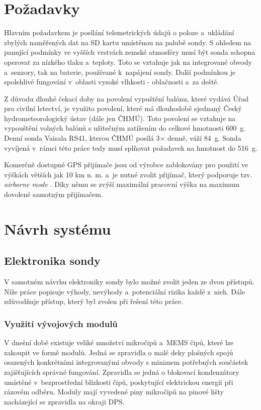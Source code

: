 \documentclass[twoside]{ctuthesis}
\theoremstyle{plain}
\theoremstyle{definition}
\theoremstyle{note}
\begin{document}
	\section{Požadavky}
	Hlavním požadavkem je posílání telemetrických údajů o poloze a~ukládání zbylých naměřených dat na SD kartu umístěnou na palubě sondy. S ohledem na panující podmínky ve vyšších vrstvách zemské atmosféry musí být sonda schopna operovat za nízkého tlaku a~teploty. Toto se vztahuje jak na integrované obvody a~senzory, tak na baterie, používané k~napájení sondy. Další podmínkou je spolehlivé fungování v~oblasti vysoké vlhkosti - oblačnosti a~za deště. 

	Z důvodu dlouhé čekací doby na povolení vypuštění balónu, které vydává Úřad pro civilní letectví, je využito povolení, které má dlouhodobě sjednaný Český hydrometeorologický ústav (dále jen ČHMÚ). Toto povolení se vztahuje na vypouštění volných balónů s užitečným zatížením do celkové hmotnosti 600~g. Denní sonda Vaisala RS41, kterou ČHMÚ posílá 3$\times$ denně, váží 84~g. Sonda vyvíjená v~rámci této práce tedy musí splňovat požadavek na hmotnost do 516~g.

	Komerčně dostupné GPS přijímače jsou od výrobce zablokovány pro použití ve výškách větších jak 10 km n. m. \cite{gps_lck} a~je nutné zvolit přijímač, který podporuje tzv. \textit{airborne mode} \cite{ublox_modes}. Díky němu se zvýší maximální pracovní výška na maximum dovolené samotným přijímačem. 


	\section{Návrh systému}
		\subsection{Elektronika sondy}

		V samotném návrhu elektroniky sondy bylo možné zvolit jeden ze dvou přístupů. Níže práce popisuje výhody, nevýhody a~potenciální rizika každé z~nich. Dále zdůvodňuje přístup, který byl zvolen při řešení této práce.

			\subsubsection{Využití vývojových modulů}
			V dnešní době existuje veliké množství mikročipů a~MEMS čipů, které lze zakoupit ve formě modulů. Jedná se zpravidla o malé deky plošných spojů osazených konkrétními integrovanými obvody s minimem potřebných součástek zajišťujících správné fungování. Zpravidla se jedná o blokovací kondenzátory umístěné v~bezprostřední blízkosti čipů, poskytující elektrickou energii při rázovém odběru. Moduly mají vyvedené piny mikročipů na pinové lišty nacházející se zpravidla na okraji DPS. 
\end{document}
